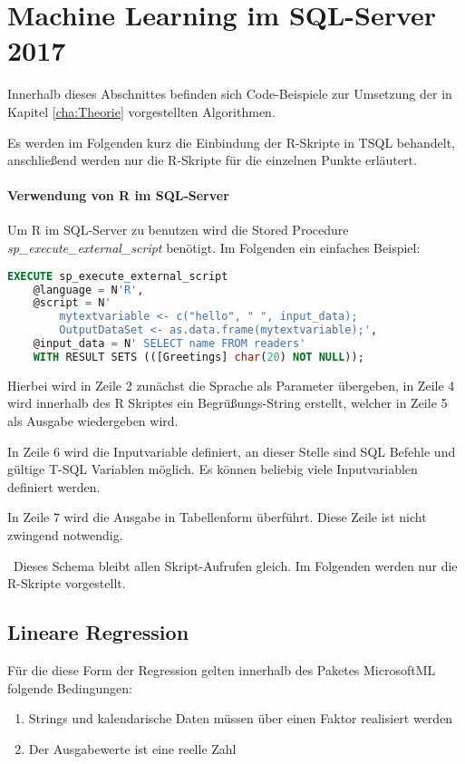 \section{Machine Learning im SQL-Server 2017}
\label{sec:MLSQL} \label{sec:MachineLearning}
Innerhalb dieses Abschnittes befinden sich Code-Beispiele zur Umsetzung der in Kapitel \ref{cha:Theorie} vorgestellten Algorithmen. 

Es werden im Folgenden kurz die Einbindung der R-Skripte in TSQL behandelt, anschließend werden nur die R-Skripte für die einzelnen Punkte erläutert.

\paragraph{Verwendung von R im SQL-Server}
Um R im SQL-Server zu benutzen wird die Stored Procedure \textit{sp\_execute\_external\_script} benötigt. Im Folgenden ein einfaches Beispiel: ~\newline

\begin{lstlisting}[language=SQL]
	EXECUTE sp_execute_external_script
	@language = N'R',
	@script = N' 
		mytextvariable <- c("hello", " ", input_data);
		OutputDataSet <- as.data.frame(mytextvariable);',
	@input_data = N' SELECT name FROM readers'
	WITH RESULT SETS (([Greetings] char(20) NOT NULL));
\end{lstlisting}

Hierbei wird in Zeile 2 zunächst die Sprache als Parameter übergeben, in Zeile 4 wird innerhalb des R Skriptes ein Begrüßungs-String erstellt, welcher in Zeile 5 als Ausgabe wiedergeben wird.

In Zeile 6 wird die Inputvariable definiert, an dieser Stelle sind SQL Befehle und gültige T-SQL Variablen möglich. Es können beliebig viele Inputvariablen definiert werden. 

In Zeile 7 wird die Ausgabe in Tabellenform überführt. Diese Zeile ist nicht zwingend notwendig.  

~\newline Dieses Schema bleibt allen Skript-Aufrufen gleich. Im Folgenden werden nur die R-Skripte vorgestellt.
\subsection{Lineare Regression}
Für die diese Form der Regression gelten innerhalb des Paketes MicrosoftML folgende Bedingungen: ~\newline
\begin{enumerate}
	\item Strings und kalendarische Daten müssen über einen Faktor realisiert werden 
	\item Der Ausgabewerte ist eine reelle Zahl 
\end{enumerate}

